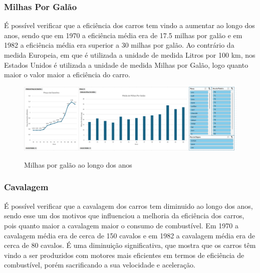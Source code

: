 \documentclass[a4paper]{article}
\begin{document}
\newpage

\subsubsection{Milhas Por Galão}
É possível verificar que a eficiência dos carros tem vindo a aumentar ao longo dos anos,
sendo que em 1970 a eficiência média era de 17.5 milhas por galão e em 1982 a eficiência média 
era superior a 30 milhas por galão. Ao contrário da medida Europeia, em que é utilizada a unidade de medida
Litros por 100 km, nos Estados Unidos é utilizada a unidade de medida Milhas por Galão, logo quanto maior o valor
maior a eficiência do carro.

\begin{figure}[h!]
    \raggedright
    \includegraphics[width=1.2\textwidth]{Recursos/MilhasPorGalaoGrafico.png} %
    \vspace{0.5cm}
    \label{fig:mpg}
    \caption{Milhas por galão ao longo dos anos}
\end{figure}
\newpage



\subsubsection{Cavalagem}
É possível verificar que a cavalagem dos carros tem diminuido ao longo dos anos, sendo esse um dos motivos
que influenciou a melhoria da eficiência dos carros, pois quanto maior a cavalagem maior o consumo de combustível.
Em 1970 a cavalagem média era de cerca de 150 cavalos e em 1982 a cavalagem média era de cerca de 80 cavalos.
É uma diminuição significativa, que mostra que os carros têm vindo a ser produzidos com motores mais eficientes em termos
de eficiência de combustível, porém sacrificando a sua velocidade e aceleração.
\end{document}
